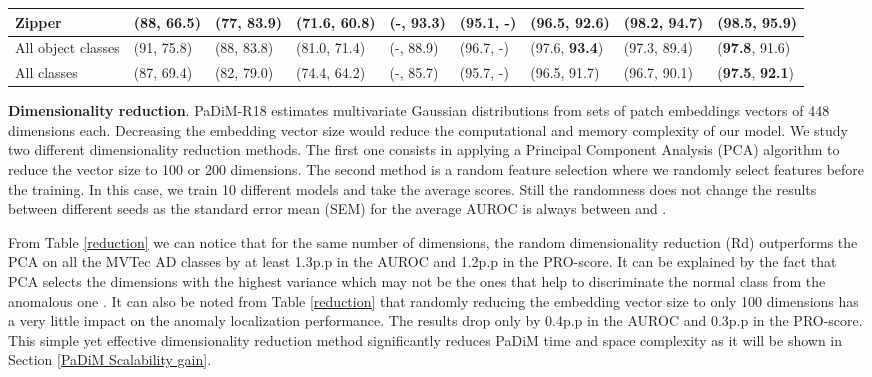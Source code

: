 \documentclass[a4paper,conference]{IEEEtran}
\begin{document}
\begin{table*}[!ht]
{\begin{tabular}{|p{2.3cm}||p{1.3cm}|p{1.2cm}|p{1.4cm}||p{1.2cm}|p{1.3cm}|p{1.4cm}||p{1.4cm}|p{1.6cm}|}
Zipper & (88, 66.5) & (77, 83.9) &(71.6, 60.8)& (-, 93.3) & (95.1, -) &(96.5, 92.6) &(98.2, 94.7) &  (\textbf{98.5}, \textbf{95.9})  \\ \hline
All object classes & (91, 75.8) & (88, 83.8) &(81.0, 71.4) &(-, 88.9) & (96.7, -) & (97.6, \textbf{93.4}) &(97.3, 89.4)  & (\textbf{97.8}, 91.6) \\ \hline
All classes & (87, 69.4) & (82, 79.0) &(74.4, 64.2) & (-, 85.7) & (95.7, -) &(96.5, 91.7) &(96.7, 90.1) &(\textbf{97.5}, \textbf{92.1}) \\ \hline
\end{tabular}
}

\label{tab:tab_locmvtec}
\end{table*}


\textbf{Dimensionality reduction}. PaDiM-R18 estimates multivariate Gaussian distributions from sets of patch embeddings vectors of 448 dimensions each. Decreasing the embedding vector size would reduce the computational and memory complexity of our model. We study two different dimensionality reduction methods. The first one consists in applying a Principal Component Analysis (PCA) algorithm to reduce the vector size to 100 or 200 dimensions. The second method is a random feature selection where we randomly select features before the training. In this case, we train 10 different models and take the average scores.  Still the randomness does not change the results between different seeds as the standard error mean (SEM) for the average AUROC is always between  and .

 
 From Table \ref{reduction} we can notice that for the same number of dimensions, the random dimensionality reduction (Rd) outperforms the PCA on all the MVTec AD classes by at least 1.3p.p in the AUROC and 1.2p.p in the PRO-score. It can be explained by the fact that PCA selects the dimensions with the highest variance which may not be the ones that help to discriminate the normal class from the anomalous one \cite{rippel2020modeling}.
 It can also be noted from Table \ref{reduction} that randomly reducing the embedding vector size to only 100 dimensions has a very little impact on the anomaly localization performance. The results drop only by 0.4p.p in the AUROC and 0.3p.p in the PRO-score. This simple yet effective dimensionality reduction method significantly reduces PaDiM time and space complexity as it will be shown in Section \ref{PaDiM Scalability gain}.


 
\end{document}
